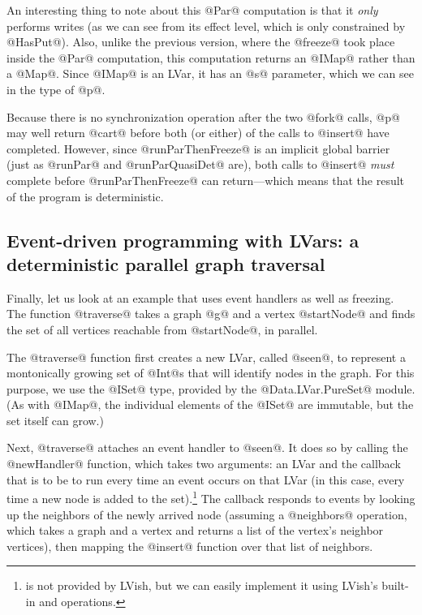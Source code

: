 \noindent An interesting thing to note about this @Par@ computation is
that it \emph{only} performs writes (as we can see from its effect
level, which is only constrained by @HasPut@).  Also, unlike the
previous version, where the @freeze@ took place inside the @Par@
computation, this computation returns an @IMap@ rather than a @Map@.
Since @IMap@ is an LVar, it has an @s@ parameter, which we can see in
the type of @p@.

Because there is no synchronization operation after the two @fork@
calls, @p@ may well return @cart@ before both (or either) of the calls
to @insert@ have completed.  However, since @runParThenFreeze@ is an
implicit global barrier (just as @runPar@ and @runParQuasiDet@ are),
both calls to @insert@ \emph{must} complete before @runParThenFreeze@
can return---which means that the result of the program is
deterministic.

\subsection{Event-driven programming with LVars: a deterministic parallel graph traversal}

Finally, let us look at an example that uses event handlers as well as
freezing.  The function @traverse@ takes a graph @g@ and a vertex
@startNode@ and finds the set of all vertices reachable from
@startNode@, in parallel.

\singlespacing

\doublespacing

\noindent The @traverse@ function first creates a new LVar, called
@seen@, to represent a montonically growing set of @Int@s that will
identify nodes in the graph.  For this purpose, we use the @ISet@
type, provided by the @Data.LVar.PureSet@ module.  (As with @IMap@,
the individual elements of the @ISet@ are immutable, but the set
itself can grow.)

Next, @traverse@ attaches an event handler to @seen@.  It does so by
calling the @newHandler@ function, which takes two arguments: an LVar
and the callback that is to be to run every time an event occurs on
that LVar (in this case, every time a new node is added to the
set).\footnote{ is not provided by LVish, but we can
  easily implement it using LVish's built-in  and
   operations.}
The callback responds to events by looking up the neighbors of the
newly arrived node (assuming a @neighbors@ operation, which takes a
graph and a vertex and returns a list of the vertex's neighbor
vertices), then mapping the @insert@ function over that list of
neighbors.

